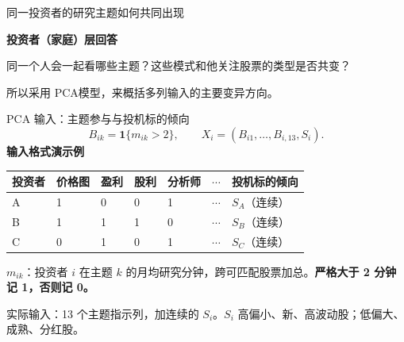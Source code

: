 \begin{frame}[label=pc-why]{同一投资者的研究主题如何共同出现}
  {\textbf{投资者（家庭）层回答}\par\small
    同一个人会一起看哪些主题？这些模式和他关注股票的类型是否共变？\par
    所以采用 PCA模型，来概括多列输入的主要变异方向。}
  \medskip
\end{frame}

\begin{frame}[label=pc-input]{PCA 输入：主题参与与投机标的倾向}
  \[
    B_{ik}=\mathbf{1}\{m_{ik}>2\},
    \qquad X_i=(B_{i1},\ldots,B_{i,13},S_i).
  \]
  \small
  \textbf{输入格式演示例}\par\smallskip
  \begin{tabularx}{\linewidth}{@{}l*{5}{Y}L{.19\linewidth}@{}}
    \toprule 投资者 & 价格图 & 盈利 & 股利 & 分析师 & \(\cdots\) & 投机标的倾向\\\midrule
    A & 1 & 0 & 0 & 1 & \(\cdots\) & \(S_A\)（连续）\\
    B & 1 & 1 & 1 & 0 & \(\cdots\) & \(S_B\)（连续）\\
    C & 0 & 1 & 0 & 1 & \(\cdots\) & \(S_C\)（连续）\\\bottomrule
  \end{tabularx}\par\medskip
  \(m_{ik}\)：投资者 \(i\) 在主题 \(k\) 的月均研究分钟，跨可匹配股票加总。\textbf{严格大于 2 分钟记 1，否则记 0。}\par\smallskip
  实际输入：13 个主题指示列，加连续的 \(S_i\)。\(S_i\) 高偏小、新、高波动股；低偏大、成熟、分红股。
  \small{}
\end{frame}

